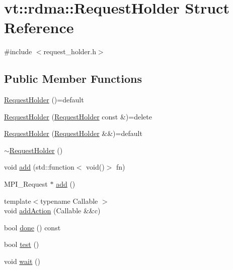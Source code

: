\hypertarget{structvt_1_1rdma_1_1_request_holder}{}\section{vt\+:\+:rdma\+:\+:Request\+Holder Struct Reference}
\label{structvt_1_1rdma_1_1_request_holder}


{\ttfamily \#include $<$request\+\_\+holder.\+h$>$}

\subsection*{Public Member Functions}
\begin{DoxyCompactItemize}
\item 
\hyperlink{structvt_1_1rdma_1_1_request_holder_a3c892c8221207bfc7039770d4fd03dab}{Request\+Holder} ()=default
\item 
\hyperlink{structvt_1_1rdma_1_1_request_holder_a23ee7c46fc8ebdd804d395eedd0c9cd6}{Request\+Holder} (\hyperlink{structvt_1_1rdma_1_1_request_holder}{Request\+Holder} const \&)=delete
\item 
\hyperlink{structvt_1_1rdma_1_1_request_holder_a90a5bd5c4e43ac566224b694768c1417}{Request\+Holder} (\hyperlink{structvt_1_1rdma_1_1_request_holder}{Request\+Holder} \&\&)=default
\item 
\hyperlink{structvt_1_1rdma_1_1_request_holder_a3853124a44bcbf4c3446f7d68fdfa0ed}{$\sim$\+Request\+Holder} ()
\item 
void \hyperlink{structvt_1_1rdma_1_1_request_holder_a3d4c6399e1b7a28fd6bfceccce5fc506}{add} (std\+::function$<$ void()$>$ fn)
\item 
M\+P\+I\+\_\+\+Request $\ast$ \hyperlink{structvt_1_1rdma_1_1_request_holder_ae93f67442bf8ce1ff724d49a2c9b9e0f}{add} ()
\item 
{\footnotesize template$<$typename Callable $>$ }\\void \hyperlink{structvt_1_1rdma_1_1_request_holder_a1cfecd1b2c71b179683a13a4cd920419}{add\+Action} (Callable \&\&c)
\item 
bool \hyperlink{structvt_1_1rdma_1_1_request_holder_aa75a051ff0517bde8ccbf9e3986c0b5d}{done} () const
\item 
bool \hyperlink{structvt_1_1rdma_1_1_request_holder_ae363ac2a5fcee1fed9fc1d9393d69981}{test} ()
\item 
void \hyperlink{structvt_1_1rdma_1_1_request_holder_ac39a770edd579e49cf95f5238e5aabb6}{wait} ()
\end{DoxyCompactItemize}


